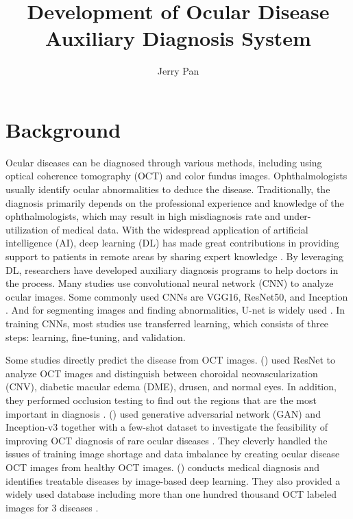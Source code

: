 \documentclass{article}
\newcommand{\authyear}[1]{\citeauthor{#1} (\citeyear{#1})}
\begin{document}
	\title{\vspace{-2.25cm} Development of Ocular Disease Auxiliary Diagnosis System}
	\author{Jerry Pan}
	\date{}
	\maketitle
	
	\vspace{0.5cm}
	\tableofcontents
	
	\pagebreak
	
	\section{Background}
		
		Ocular diseases can be diagnosed through various methods, including using optical coherence tomography (OCT) and color fundus images. Ophthalmologists usually identify ocular abnormalities to deduce the disease.  Traditionally, the diagnosis primarily depends on the professional experience and knowledge of the ophthalmologists, which may result in high misdiagnosis rate and under-utilization of medical data.  With the widespread application of artificial intelligence (AI), deep learning (DL) has made great contributions in providing support to patients in remote areas by sharing expert knowledge \autocite{Ichhpujani_Thakur_2021}.  By leveraging DL, researchers have developed auxiliary diagnosis programs to help doctors in the process. Many studies use convolutional neural network (CNN) to analyze ocular images. Some commonly used CNNs are VGG16, ResNet50, and Inception \autocite{daich2023artificial}.  And for segmenting images and finding abnormalities, U-net is widely used \autocite{Ronneberger_Fischer_Brox_2015}. In training CNNs, most studies use transferred learning, which consists of three steps: learning, fine-tuning, and validation.
		
		Some studies directly predict the disease from OCT images.
		\authyear{li2019deep} used ResNet to analyze OCT images and distinguish between choroidal neovascularization (CNV), diabetic macular edema (DME), drusen, and normal eyes. In addition, they performed occlusion testing to find out the regions that are the most important in diagnosis \autocite{li2019deep}. 
		\authyear{yoo2021feasibility} used generative adversarial network (GAN) and Inception-v3 together with a few-shot dataset to investigate the feasibility of improving OCT diagnosis of rare ocular diseases \autocite{yoo2021feasibility}.  They cleverly handled the issues of training image shortage and data imbalance by creating ocular disease OCT images from healthy OCT images. \authyear{Kermany2018} conducts medical diagnosis and identifies treatable diseases by image-based deep learning.  They also provided a widely used database including more than one hundred thousand OCT labeled images for 3 diseases \autocite{Kermany2018}.
		
\end{document}
